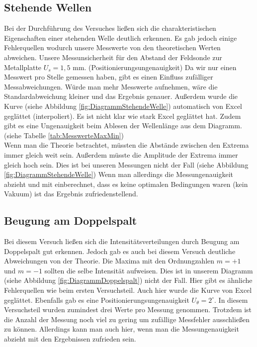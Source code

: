 \documentclass[a4paper]{scrartcl}
\numberwithin{equation}{subsection}
\begin{document}
\subsection{Stehende Wellen}
Bei der Durchführung des Versuches ließen sich die charakteristischen Eigenschaften einer stehenden Welle deutlich erkennen. Es gab jedoch einige Fehlerquellen wodurch unsere Messwerte von den theoretischen Werten abweichen. Unsere Messunsicherheit für den Abstand der Feldsonde zur Metallplatte $U_s = 1,5$ mm. (Positionierungsungenauigkeit)
Da wir nur einen Messwert pro Stelle gemessen haben, gibt es einen Einfluss zufälliger Messabweichungen. Würde man mehr Messwerte aufnehmen, wäre die Standardabweichung kleiner und das Ergebnis genauer.
Außerdem wurde die Kurve (siehe Abbildung \ref{fig:DiagrammStehendeWelle}) automatisch von Excel geglättet (interpoliert). Es ist nicht klar wie stark Excel geglättet hat.
Zudem gibt es eine Ungenauigkeit beim Ablesen der Wellenlänge aus dem Diagramm.
(siehe Tabelle \ref{tab:MesswerteMaxMin})\\
Wenn man die Theorie betrachtet, müssten die Abstände zwischen den Extrema immer gleich weit sein. Außerdem müsste die Amplitude der Extrema immer gleich hoch sein. Dies ist bei unseren Messungen nicht der Fall (siehe Abbildung \ref{fig:DiagrammStehendeWelle})
Wenn man allerdings die Messungenauigkeit abzieht und mit einberechnet, dass es keine optimalen Bedingungen waren (kein Vakuum) ist das Ergebnis zufriedenstellend.

\subsection{Beugung am Doppelspalt}
Bei diesem Versuch ließen sich die Intensitätsverteilungen durch Beugung am Doppelspalt gut erkennen. Jedoch gab es auch bei diesem Versuch deutliche Abweichungen von der Theorie. Die Maxima mit den Ordnungzahlen $m = +1$ und $m = -1$ sollten die selbe Intensität aufweisen. Dies ist in unserem Diagramm (siehe Abbildung \ref{fig:DiagrammDoppelspalt}) nicht der Fall. Hier gibt es ähnliche Fehlerquellen wie beim ersten Versuchsteil. Auch hier wurde die Kurve von Excel geglättet. Ebenfalls gab es eine Positionierungsungenauigkeit $U_{\theta} = 2 ^\circ$. In diesem Versuchsteil wurden zumindest drei Werte pro Messung genommen. Trotzdem ist die Anzahl der Messung noch viel zu gering um zufällige Messfehler ausschließen zu können.
Allerdings kann man auch hier, wenn man die Messungenauigkeit abzieht mit den Ergebnissen zufrieden sein.
\end{document}
